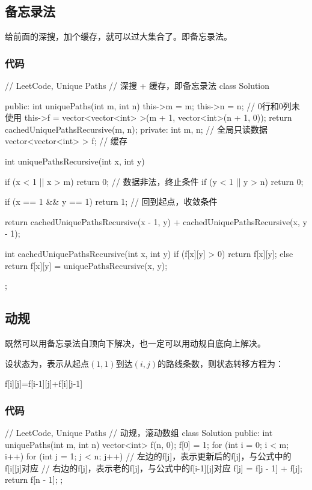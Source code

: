 \subsection{备忘录法}
给前面的深搜，加个缓存，就可以过大集合了。即备忘录法。

\subsubsection{代码}
\begin{Code}
// LeetCode, Unique Paths
// 深搜 + 缓存，即备忘录法
class Solution {
public:
    int uniquePaths(int m, int n) {
        this->m = m;
        this->n = n;
        // 0行和0列未使用
        this->f = vector<vector<int> >(m + 1, vector<int>(n + 1, 0));
        return cachedUniquePathsRecursive(m, n);
    }
private:
    int m, n;  // 全局只读数据
    vector<vector<int> > f;  // 缓存

    int uniquePathsRecursive(int x, int y) {
        if (x < 1 || x > m) return 0; // 数据非法，终止条件
        if (y < 1 || y > n) return 0;

        if (x == 1 && y == 1) return 1; // 回到起点，收敛条件

        return cachedUniquePathsRecursive(x - 1, y) +
                cachedUniquePathsRecursive(x, y - 1);
    }

    int cachedUniquePathsRecursive(int x, int y) {
        if (f[x][y] > 0) return f[x][y];
        else return f[x][y] = uniquePathsRecursive(x, y);
    }
};
\end{Code}


\subsection{动规}
既然可以用备忘录法自顶向下解决，也一定可以用动规自底向上解决。

设状态为，表示从起点$(1,1)$到达$(i,j)$的路线条数，则状态转移方程为：
\begin{Code}
f[i][j]=f[i-1][j]+f[i][j-1]
\end{Code}


\subsubsection{代码}
\begin{Code}
// LeetCode, Unique Paths
// 动规，滚动数组
class Solution {
public:
    int uniquePaths(int m, int n) {
        vector<int> f(n, 0);
        f[0] = 1;
        for (int i = 0; i < m; i++) {
            for (int j = 1; j < n; j++) {
                // 左边的f[j]，表示更新后的f[j]，与公式中的f[i[[j]对应
                // 右边的f[j]，表示老的f[j]，与公式中的f[i-1][j]对应
                f[j] = f[j - 1] + f[j];
            }
        }
        return f[n - 1];
    }
};
\end{Code}


